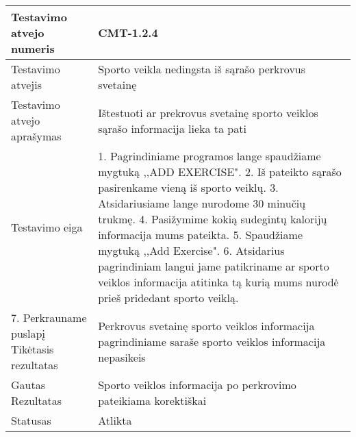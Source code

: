 \documentclass[oneside]{VUMIFPSkursinis}
\begin{document}
\begin{center}
    \begin{tabular}{ |p{5cm}|p{13cm}|}
    \hline
        Testavimo atvejo numeris & CMT-1.2.4  \\ \hline
        Testavimo atvejis & Sporto veikla nedingsta iš sąrašo perkrovus svetainę  \\ \hline
        Testavimo atvejo aprašymas & Ištestuoti ar prekrovus svetainę sporto veiklos sąrašo informacija lieka ta pati  \\ \hline
        Testavimo eiga &  1. Pagrindiniame programos lange spaudžiame mygtuką ,,ADD EXERCISE". 
				2. Iš pateikto sąrašo pasirenkame vieną iš sporto veiklų. 
				3. Atsidariusiame lange nurodome 30 minučių trukmę.
				4. Pasižymime kokią sudegintų kalorijų informacija mums pateikta. 
				5. Spaudžiame mygtuką ,,Add Exercise".
				6. Atsidarius pagrindiniam langui jame patikriname ar sporto veiklos informacija atitinka tą kurią mums nurodė prieš pridedant sporto veiklą.\\ \hline
				7. Perkrauname puslapį
        Tikėtasis rezultatas &  Perkrovus svetainę sporto veiklos informacija pagrindiniame saraše sporto veiklos informacija nepasikeis\\ \hline
        Gautas Rezultatas & Sporto veiklos informacija po perkrovimo pateikiama korektiškai  \\ \hline
        Statusas & Atlikta  \\ \hline
    \hline
    \end{tabular}
\end{center}
\end{document}
